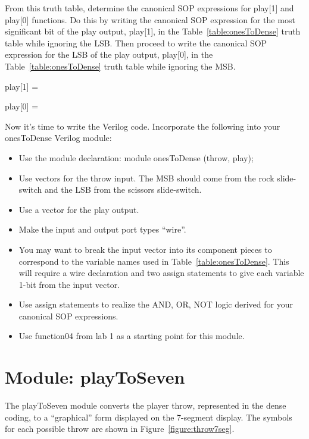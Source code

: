 From this truth table, determine the canonical SOP expressions for
play{[}1{]} and play{[}0{]} functions. Do this by writing the canonical
SOP expression for the most significant bit of the play output,
play{[}1{]}, in the Table~\ref{table:onesToDense} truth table while ignoring the LSB. Then
proceed to write the canonical SOP expression for the LSB of the play
output, play{[}0{]}, in the Table~\ref{table:onesToDense} truth table while ignoring the MSB.

\protect\hypertarget{ones2Dense_CanonicalSOP}{}{}play{[}1{]} =

play{[}0{]} =

\protect\hypertarget{ones2Dense_Verilog}{}{}Now it's time to write the
Verilog code. Incorporate the following into your onesToDense Verilog
module:

\begin{itemize}
    \item
        Use the module declaration: module onesToDense (throw, play);
    \item
        Use vectors for the throw input. The MSB should come from the rock
        slide-switch and the LSB from the scissors slide-switch.
    \item
        Use a vector for the play output.
    \item
        Make the input and output port types ``wire''.
    \item
        You may want to break the input vector into its component pieces to
        correspond to the variable names used in Table~\ref{table:onesToDense}.
        This will require
        a wire declaration and two assign statements to give each variable
        1-bit from the input vector.
    \item
        Use assign statements to realize the AND, OR, NOT logic derived for
        your canonical SOP expressions.
    \item
        Use function04 from lab 1 as a starting point for this module.
\end{itemize}

\hypertarget{playtoseven-module}{%
    \section{Module: playToSeven}
\label{playtoseven-module}}

The playToSeven module converts the player throw, represented in the
dense coding, to a ``graphical'' form displayed on the 7-segment
display. The symbols for each possible throw are shown in Figure~\ref{figure:throw7seg}.

